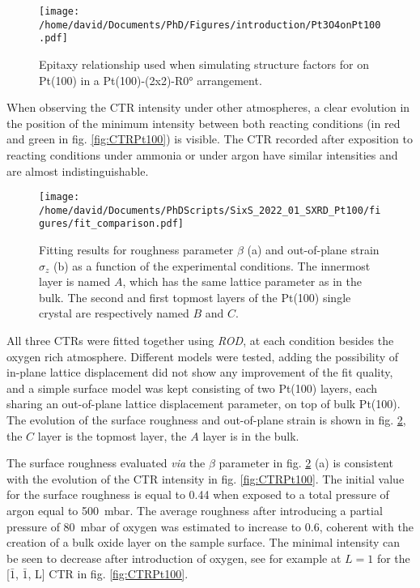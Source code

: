 \begin{figure}[!htb]
    \centering
    \texttt{[image: /home/david/Documents/PhD/Figures/introduction/Pt3O4onPt100.pdf]}
    \caption{
    Epitaxy relationship used when simulating structure factors for  on Pt(100) in a Pt(100)-(2x2)-R\ang{0} arrangement.
    }
    \label{fig:Pt3O4onPt100}
\end{figure}

When observing the CTR intensity under other atmospheres, a clear evolution in the position of the minimum intensity between both reacting conditions (in red and green in fig. \ref{fig:CTRPt100}) is visible.
The CTR recorded after exposition to reacting conditions under ammonia or under argon have similar intensities and are almost indistinguishable.

\begin{figure}[!htb]
    \centering
    \texttt{[image: /home/david/Documents/PhDScripts/SixS\_2022\_01\_SXRD\_Pt100/figures/fit\_comparison.pdf]}
    \caption{
        Fitting results for roughness parameter $\beta$ (a) and out-of-plane strain $\sigma_z$ (b) as a function of the experimental conditions.
        The innermost layer is named $A$, which has the same lattice parameter as in the bulk.
        The second and first topmost layers of the Pt(100) single crystal are respectively named $B$ and $C$.
    }
    \label{fig:CTRFit100}
\end{figure}

All three CTRs were fitted together using \textit{ROD}, at each condition besides the oxygen rich atmosphere.
Different models were tested, adding the possibility of in-plane lattice displacement did not show any improvement of the fit quality, and a simple surface model was kept consisting of two Pt(100) layers, each sharing an out-of-plane lattice displacement parameter, on top of bulk Pt(100).
The evolution of the surface roughness and out-of-plane strain is shown in fig. \ref{fig:CTRFit100}, the $C$ layer is the topmost layer, the $A$ layer is in the bulk.

The surface roughness evaluated \textit{via} the $\beta$ parameter in fig. \ref{fig:CTRFit100} (a) is consistent with the evolution of the CTR intensity in fig. \ref{fig:CTRPt100}.
The initial value for the surface roughness is equal to \num{0.44} when exposed to a total pressure of argon equal to \qty{500}{\milli\bar}.
The average roughness after introducing a partial pressure of \qty{80}{\milli\bar} of oxygen was estimated to increase to \num{0.6}, coherent with the creation of a bulk oxide layer on the sample surface.
The minimal intensity can be seen to decrease after introduction of oxygen, see for example at $L=1$ for the [$\bar{1}$, $\bar{1}$, L] CTR in fig. \ref{fig:CTRPt100}.

